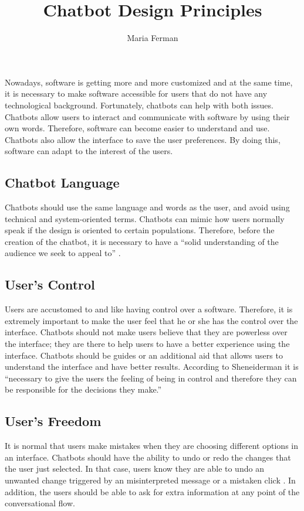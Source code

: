 \documentclass[a4paper,10pt]{article}
\title{Chatbot Design Principles}
\author{Maria Ferman}
\begin{document}
\maketitle

Nowadays, software is getting more and more customized and at the same time, it is necessary to make software accessible for users that do not have any technological background. Fortunately, chatbots can help with both issues. Chatbots allow users to interact and communicate with software by using their own words. Therefore, software can become easier to understand and use. Chatbots also allow the interface to save the user preferences. By doing this, software can adapt to the interest of the users.  

\subsection*{Chatbot Language}

Chatbots should use the same language and words as the user, and avoid using technical and system-oriented terms. Chatbots can mimic how users normally speak if the design is oriented to certain populations. Therefore, before the creation of the chatbot, it is necessary to have a ``solid understanding of the audience we seek to appeal to”  \cite{HeuristicsWebPage}. 

\subsection*{User's Control}

Users are accustomed to and like having control over a software. Therefore, it is extremely important to make the user feel that he or she has the control over the interface. Chatbots should not make users believe that they are powerless over the interface; they are there to help users to have a better experience using the interface. Chatbots should be guides or an additional aid that allows users to understand the interface and have better results. According to Sheneiderman \cite{shneiderman1997direct} it is ``necessary to give the users the feeling of being in control and therefore they can be responsible for the decisions they make.” 

\subsection*{User's Freedom}

It is normal that users make mistakes when they are choosing different options in an interface. Chatbots should have the ability to undo or redo the changes that the user just selected. In that case, users know they are able to undo an unwanted change triggered by an misinterpreted message or a mistaken click \cite{HeuristicsWebPage}. In addition, the users should be able to ask for extra information at any point of the conversational flow.
\end{document}
